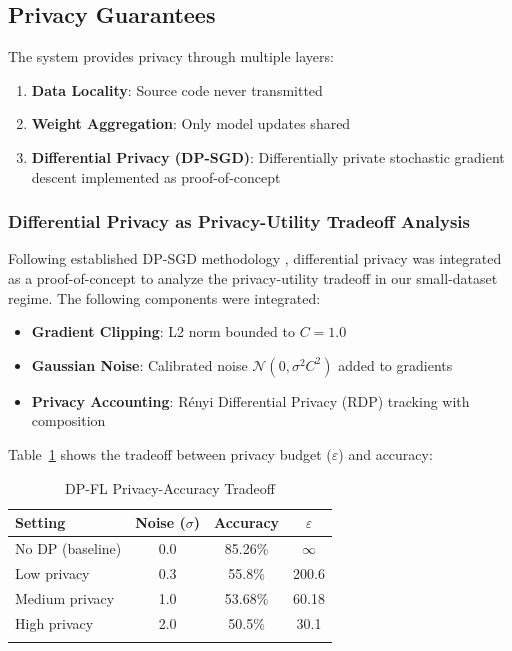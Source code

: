 \documentclass[pdflatex,sn-mathphys-num]{sn-jnl}
\theoremstyle{thmstyleone}%
\theoremstyle{thmstyletwo}%
\theoremstyle{thmstylethree}%
\begin{document}
\subsection{Privacy Guarantees}\label{subsec:privacy}

The system provides privacy through multiple layers:

\begin{enumerate}
    \item \textbf{Data Locality}: Source code never transmitted
    \item \textbf{Weight Aggregation}: Only model updates shared
    \item \textbf{Differential Privacy (DP-SGD)}: Differentially private stochastic gradient descent implemented as proof-of-concept
\end{enumerate}

\subsubsection{Differential Privacy as Privacy-Utility Tradeoff Analysis}\label{subsubsec:dp}

Following established DP-SGD methodology \cite{abadi2024dpsgd, mcmahan2017learning}, differential privacy was integrated as a proof-of-concept to analyze the privacy-utility tradeoff in our small-dataset regime. The following components were integrated:

\begin{itemize}
    \item \textbf{Gradient Clipping}: L2 norm bounded to $C = 1.0$
    \item \textbf{Gaussian Noise}: Calibrated noise $\mathcal{N}(0, \sigma^2 C^2)$ added to gradients
    \item \textbf{Privacy Accounting}: R\'enyi Differential Privacy (RDP) tracking with composition
\end{itemize}

Table~\ref{tab:dp} shows the tradeoff between privacy budget ($\varepsilon$) and accuracy:

\begin{table}[h]
\caption{DP-FL Privacy-Accuracy Tradeoff}\label{tab:dp}
\begin{tabular}{lccc}
\toprule
\textbf{Setting} & \textbf{Noise ($\sigma$)} & \textbf{Accuracy} & \textbf{$\varepsilon$} \\
\midrule
No DP (baseline) & 0.0 & 85.26\% & $\infty$ \\
Low privacy & 0.3 & 55.8\% & 200.6 \\
Medium privacy & 1.0 & 53.68\% & 60.18 \\
High privacy & 2.0 & 50.5\% & 30.1 \\
\botrule
\end{tabular}
\end{table}
\end{document}
